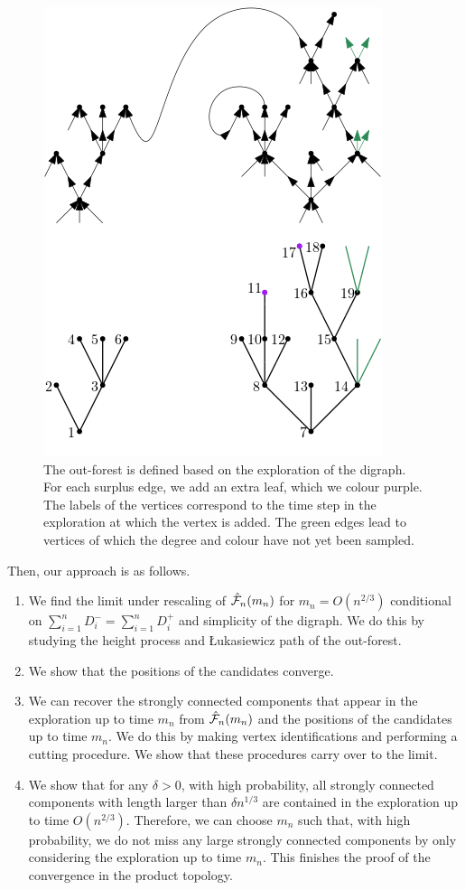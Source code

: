 \begin{figure}
    \centering
    \includegraphics[scale=0.8]{Content/Pictures/Configuration model out-forest.png}
    \caption{The out-forest is defined based on the exploration of the digraph. For each surplus edge, we add an extra leaf, which we colour purple. The labels of the vertices correspond to the time step in the exploration at which the vertex is added. The green edges lead to vertices of which the degree and colour have not yet been sampled.}
    \label{fig.configuration modeloutforest}
\end{figure}
Then, our approach is as follows.
\begin{enumerate}
    \item We find the limit under rescaling of $\hat{{\mathcal F}}_n(m_n)$ for $m_n=O(n^{2/3})$ conditional on $\sum_{i=1}^n D^-_i=\sum_{i=1}^n D^+_i$ and simplicity of the digraph. We do this by studying the height process and \L ukasiewicz path of the out-forest.
    \item We show that the positions of the candidates converge.
    \item We can recover the strongly connected components that appear in the exploration up to time $m_n$ from  $\hat{{\mathcal F}}_n(m_n)$ and the positions of the candidates up to time $m_n$. We do this by making vertex identifications and performing a cutting procedure. We show that these procedures carry over to the limit.
    \item We show that for any $\delta>0$, with high probability, all strongly connected components with length larger than $\delta n^{1/3}$ are contained in the exploration up to time $O(n^{2/3})$. Therefore, we can choose $m_n$ such that, with high probability, we do not miss any large strongly connected components by only considering the exploration up to time $m_n$. This finishes the proof of the convergence in the product topology.
\end{enumerate}

